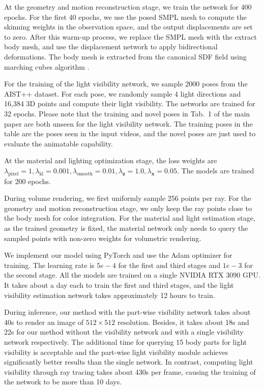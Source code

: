 At the geometry and motion reconstruction stage, we train the network for 400 epochs. For the first 40 epochs, we use the posed SMPL \cite{loper2015smpl} mesh to compute the skinning weights in the observation space, and the output displacements are set to zero.
After this warm-up process, we replace the SMPL mesh with the extract body mesh, and use the displacement network to apply bidirectional deformations.
The body mesh is extracted from the canonical SDF field using marching cubes algorithm \cite{marchingcubes}.

For the training of the light visibility network, we sample 2000 poses from the AIST++ \cite{aist} dataset.
For each pose, we randomly sample 4 light directions and 16,384 3D points and compute their light visibility.
The networks are trained for 32 epochs.
Please note that the training and novel poses in Tab.~1 of the main paper are both unseen for the light visibility network. 
The training poses in the table are the poses seen in the input videos, and the novel poses are just used to evaluate the animatable capability.

At the material and lighting optimization stage, the loss weights are $\lambda_{\text{pixel}}=1, \lambda_{\text{kl}}=0.001, \lambda_{\text{smooth}}=0.01, \lambda_{\mathbf{z}}=1.0, \lambda_{\mathbf{x}}=0.05$.
The models are trained for 200 epochs.

During volume rendering, we first uniformly sample 256 points per ray.
For the geometry and motion reconstruction stage, we only keep the ray points close to the body mesh for color integration.
For the material and light estimation stage, as the trained geometry is fixed, the material network only needs to query the sampled points with non-zero weights for volumetric rendering.

We implement our model using PyTorch and use the Adam \cite{adam} optimizer for training.
The learning rate is $5e-4$ for the first and third stages and $1e-3$ for the second stage.
All the models are trained on a single NVIDIA RTX 3090 GPU.
It takes about a day each to train the first and third stages, and the light visibility estimation network takes approximately 12 hours to train.

During inference, our method with the part-wise visibility network takes about 40s to render an image of $512\times512$ resolution. 
Besides, it takes about 18s and 22s for our method without the visibility network and with a single visibility network respectively. 
The additional time for querying 15 body parts for light visibility is acceptable and the part-wise light visibility module achieves significantly better results than the single network.
In contrast, computing light visibility through ray tracing takes about 430s per frame, causing the training of the network to be more than 10 days. 

